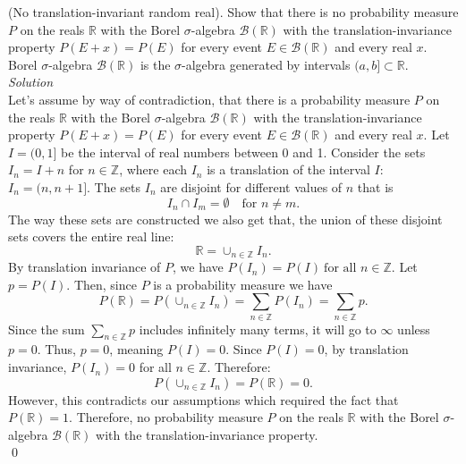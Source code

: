 \documentclass[10pt]{amsart}
\begin{document}
  (No translation-invariant random real). Show that there is no probability measure $P$ on the reals $\mathds{R}$ with the Borel
$\sigma$-algebra $\mathcal{B}(\mathds{R})$ with the translation-invariance property $P(E + x) = P(E)$ for every event $E \in \mathcal{B}(\mathds{R})$ and every real $x$. Borel $\sigma$-algebra $\mathcal{B}(\mathds{R})$ is the $\sigma$-algebra generated by intervals $(a,b] \subset \mathds{R}$.
\\
\textit{ Solution} \\
Let's assume by way of contradiction, that there is a probability measure $P$ on the reals $\mathds{R}$ with the Borel $\sigma$-algebra
$\mathcal{B}(\mathds{R})$ with the translation-invariance property $P(E + x) = P(E)$ for every event $E \in \mathcal{B}(\mathds{R})$ and every real $x$.
Let $I = (0,1]$ be the interval of real numbers between 0 and 1.
Consider the sets $I_n = I + n$ for $n \in \mathds{Z}$, where each $I_n$ is a translation of the interval $I$: $I_n = (n, n+1]$.
The sets \(I_n\) are disjoint for different values of $n$ that is
$$
I_n \cap I_m = \emptyset \quad \text{for } n \neq m.
$$
The way these sets are constructed we also get that, the union of these disjoint sets covers the entire real line:
$$
\mathbb{R} = \cup_{n \in \mathbb{Z}} I_n.
$$
\noindent
By translation invariance of $P$, we have $P(I_n) = P(I) \: \text{for all } n \in \mathbb{Z}$.
Let $p = P(I)$. Then, since $P$ is a probability measure we have
$$
P(\mathbb{R}) = P\left( \cup_{n \in \mathbb{Z}} I_n \right) = \sum_{n \in \mathbb{Z}} P(I_n) = \sum_{n \in \mathbb{Z}} p.
$$
Since the sum $\sum_{n \in \mathbb{Z}} p$ includes infinitely many terms, it will go to $\infty$ unless $p = 0$. Thus, $p = 0$, meaning $P(I) = 0$.
Since $P(I) = 0$, by translation invariance, $P(I_n) = 0$ for all $n \in \mathbb{Z}$. Therefore:
$$
P\left( \cup_{n \in \mathbb{Z}} I_n \right) = P(\mathbb{R}) = 0.
$$
However, this contradicts our assumptions which required the fact that $P(\mathbb{R}) = 1$.
Therefore, no probability measure $P$ on the reals $\mathds{R}$ with the Borel $\sigma$-algebra
$\mathcal{B}(\mathds{R})$ with the translation-invariance property. \\
\qed
\end{document}
